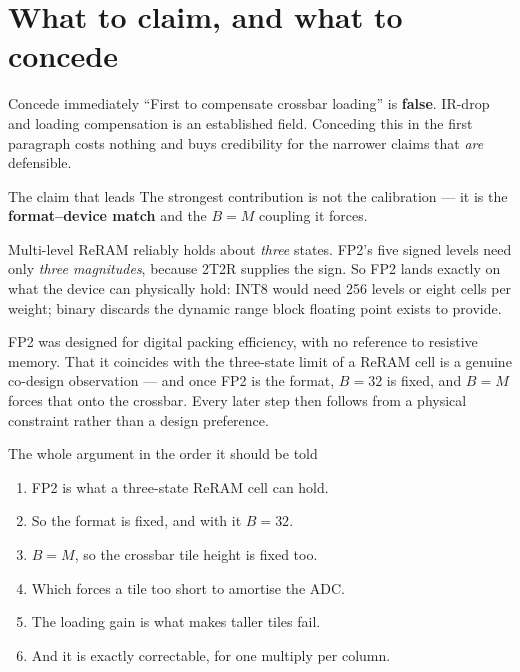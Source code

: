 \documentclass[11pt,a4paper]{report}
\begin{document}
\section{What to claim, and what to concede}

\begin{keybox}{Concede immediately}
``First to compensate crossbar loading'' is \textbf{false}. IR-drop and
loading compensation is an established field. Conceding this in the first
paragraph costs nothing and buys credibility for the narrower claims that
\emph{are} defensible.
\end{keybox}

\begin{keybox}{The claim that leads}
The strongest contribution is not the calibration --- it is the
\textbf{format--device match} and the $B{=}M$ coupling it forces.

Multi-level ReRAM reliably holds about \emph{three} states. FP2's five signed
levels need only \emph{three magnitudes}, because 2T2R supplies the sign. So
FP2 lands exactly on what the device can physically hold: INT8 would need 256
levels or eight cells per weight; binary discards the dynamic range block
floating point exists to provide.

FP2 was designed for digital packing efficiency, with no reference to
resistive memory. That it coincides with the three-state limit of a ReRAM cell
is a genuine co-design observation --- and once FP2 is the format, $B{=}32$ is
fixed, and $B{=}M$ forces that onto the crossbar. Every later step then follows
from a physical constraint rather than a design preference.
\end{keybox}

\begin{saybox}{The whole argument in the order it should be told}
\begin{enumerate}[leftmargin=1.4em,itemsep=2pt]
  \item FP2 is what a three-state ReRAM cell can hold.
  \item So the format is fixed, and with it $B = 32$.
  \item $B = M$, so the crossbar tile height is fixed too.
  \item Which forces a tile too short to amortise the ADC.
  \item The loading gain is what makes taller tiles fail.
  \item And it is exactly correctable, for one multiply per column.
\end{enumerate}
\end{saybox}
\end{document}
